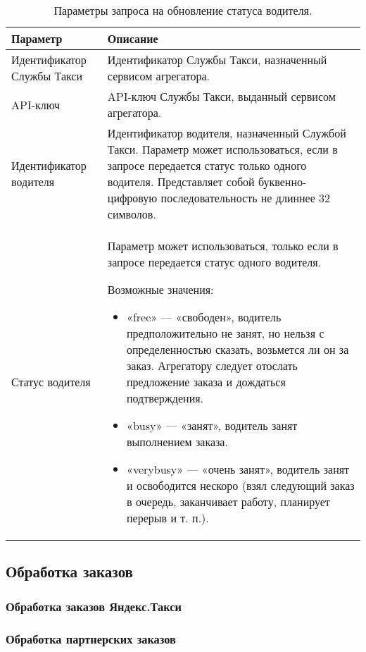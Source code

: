             \begin{table}[h]
	            \begin{center}
	            \label{change_driver_status_request_parametrs}
	            \caption {Параметры запроса на обновление статуса водителя.}
	            \setlength{\extrarowheight}{2mm}
	            \begin{tabular}{|p{5cm}|p{10cm}|}
	               \hline     \textbf{Параметр}&\textbf{Описание} \\ [2mm]

	               
	               \hline   Идентификатор Службы Такси  & Идентификатор Службы Такси, назначенный сервисом агрегатора.\\ [2mm]

	               \hline   API-ключ  & API-ключ Службы Такси, выданный сервисом агрегатора.\\ [2mm]

	               \hline   Идентификатор водителя  & Идентификатор водителя, назначенный Службой Такси. Параметр может использоваться, если в запросе передается статус только одного водителя. Представляет собой буквенно-цифровую последовательность не длиннее 32 символов. \\ [2mm]
	               
	               \hline   Статус водителя  & 

		               Параметр может использоваться, только если в запросе передается статус одного водителя. 

		               Возможные значения: 
		               		\begin{itemize}
							
								\item {«free» — «свободен», водитель предположительно не занят, но нельзя с определенностью сказать, возьмется ли он за заказ. Агрегатору следует отослать предложение заказа и дождаться подтверждения.}
								
								\item{«busy» — «занят», водитель занят выполнением заказа.}

								\item{«verybusy» — «очень занят», водитель занят и освободится нескоро (взял следующий заказ в очередь, заканчивает работу, планирует перерыв и т. п.).}
							
							\end{itemize} \\ [2mm]

	               \hline
	            \end{tabular}
	            \end{center}
            \end{table}

	\subsection{Обработка заказов}

		\subsubsection{Обработка заказов Яндекс.Такси}

		\subsubsection{Обработка партнерских заказов}
